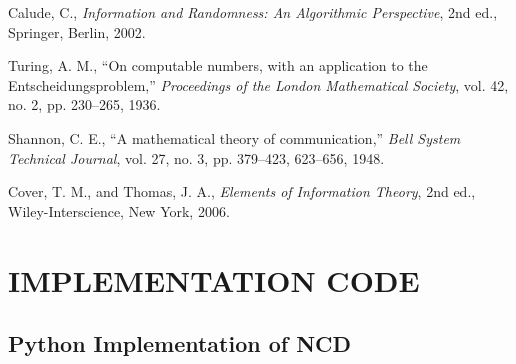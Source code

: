 \documentclass[12pt,a4paper]{report}
\begin{document}
\begin{thebibliography}{99}
Calude, C., \textit{Information and Randomness: An Algorithmic Perspective}, 2nd ed., Springer, Berlin, 2002.

Turing, A. M., ``On computable numbers, with an application to the Entscheidungsproblem,'' \textit{Proceedings of the London Mathematical Society}, vol. 42, no. 2, pp. 230--265, 1936.

Shannon, C. E., ``A mathematical theory of communication,'' \textit{Bell System Technical Journal}, vol. 27, no. 3, pp. 379--423, 623--656, 1948.

Cover, T. M., and Thomas, J. A., \textit{Elements of Information Theory}, 2nd ed., Wiley-Interscience, New York, 2006.

\end{thebibliography}

\appendix

\chapter{IMPLEMENTATION CODE}

\section{Python Implementation of NCD}
\end{document}
